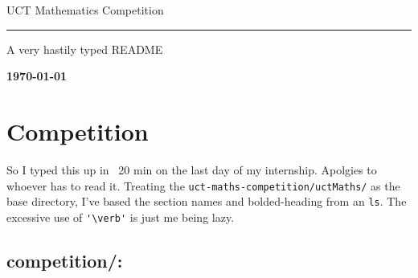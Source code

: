 \documentclass[a4paper,12pt]{article}
\begin{document}
 
\thispagestyle{empty}
{\Huge \begin{center}
UCT Mathematics Competition
\hrule 
{\Large A very hastily typed README}
\end{center}}


\vskip 5mm
\begin{center}{\bf \today}
\end{center}

\newpage

\tableofcontents

\newpage
\fancyhead[RE,LO]{}
\fancyhead[LE]{\leftmark}
\fancyhead[RO]{\rightmark}
\pagestyle{fancy}

\section{Competition}

So I typed this up in ~20 min on the last day of my internship. Apolgies to whoever has to read it. Treating the \verb|uct-maths-competition/uctMaths/| as the base directory, I've based the section names and bolded-heading from an \verb|ls|. The excessive use of \verb|'\verb'| is just me being lazy. 

\subsection{competition/:}
\end{document}
